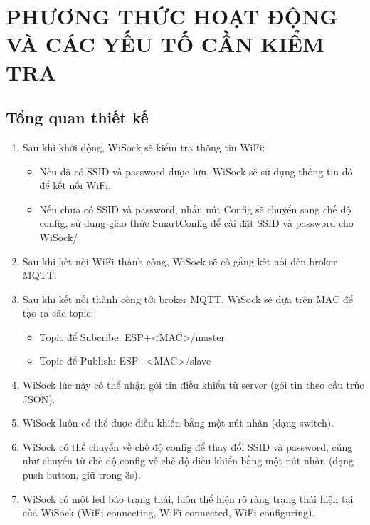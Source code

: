 \documentclass[a4paper]{article}
\let\oldsection\section
\renewcommand\section{\clearpage\oldsection}
\begin{document}
\section{PHƯƠNG THỨC HOẠT ĐỘNG VÀ CÁC YẾU TỐ CẦN KIỂM TRA}
\subsection{Tổng quan thiết kế}
\begin{enumerate}
	\item Sau khi khởi động, WiSock sẽ kiểm tra thông tin WiFi:
	\begin{itemize}
		\item Nếu đã có SSID và password được lưu, WiSock sẽ sử dụng thông tin đó để kết nối WiFi.
		\item Nếu chưa có SSID và password, nhấn nút Config sẽ chuyển sang chế độ config, sử dụng giao thức SmartConfig để cài đặt SSID và password cho WiSock/
	\end{itemize}
	\item Sau khi kết nối WiFi thành công, WiSock sẽ cố gắng kết nối đến broker MQTT.
	\item Sau khi kết nối thành công tới broker MQTT, WiSock sẽ dựa trên MAC để tạo ra các topic:
	\begin{itemize}
		\item Topic để Subcribe: ESP+<MAC>/master
		\item Topic để Publish: ESP+<MAC>/slave
	\end{itemize}
	\item WiSock lúc này có thể nhận gói tin điều khiển từ server (gói tin theo cấu trúc JSON).
	\item WiSock luôn có thể được điều khiển bằng một nút nhấn (dạng switch).
	\item WiSock có thể chuyển về chế độ config để thay đổi SSID và password, cũng như chuyển từ chế độ config về chế độ điều khiển bằng một nút nhấn (dạng push button, giữ trong 3s).
	\item WiSock có một led báo trạng thái, luôn thể hiện rõ ràng trạng thái hiện tại của WiSock (WiFi connecting, WiFi connected, WiFi configuring).
\end{enumerate}
\end{document}
